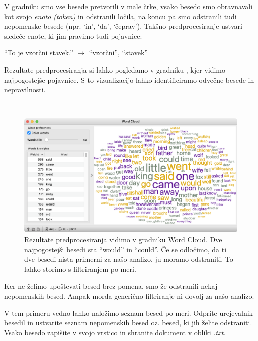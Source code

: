V gradniku  smo vse besede pretvorili v male črke, vsako besedo smo obravnavali kot svojo \textit{enoto (token)} in odstranili ločila, na koncu pa smo odstranili tudi nepomenske besede (npr. ‘in’, ‘da’, ‘čeprav’). Takšno predprocesiranje ustvari sledeče enote, ki jim pravimo tudi pojavnice:

\vspace{0.3cm}
\noindent ``To je vzorčni stavek.'' $\rightarrow$ ``vzorčni'', ``stavek''
\vspace{0.3cm}

Rezultate predprocesiranja si lahko pogledamo v gradniku , kjer vidimo najpogostejše pojavnice. S to vizualizacijo lahko identificiramo odvečne besede in nepravilnosti.

 \newpage

\begin{figure}[h]
  \centering
  \includegraphics[width=\linewidth]{word-cloud.png}%
  \caption{Rezultate predprocesiranja vidimo v gradniku Word Cloud. Dve najpogostejši besedi sta “would” in “could”. Če se odločimo, da ti dve besedi nista primerni za našo analizo, ju moramo odstraniti. To lahko storimo s filtriranjem po meri.}
  \label{fig:002-word-cloud}
\end{figure}

Ker ne želimo upoštevati besed brez pomena, smo že odstranili nekaj nepomenskih besed. Ampak morda generično filtriranje ni dovolj za našo analizo.

V tem primeru vedno lahko naložimo seznam besed po meri. Odprite urejevalnik besedil in ustvarite seznam nepomenskih besed oz. besed, ki jih želite odstraniti. Vsako besedo zapišite v svojo vrstico in shranite dokument v obliki \textit{.txt}.

